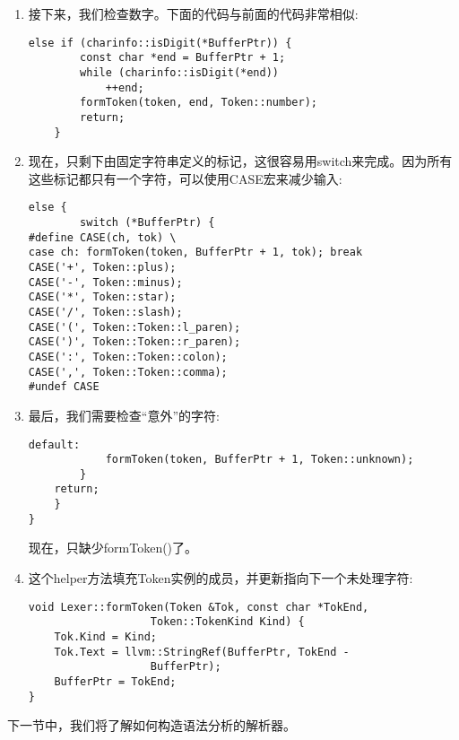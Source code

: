 \begin{enumerate}
\item 接下来，我们检查数字。下面的代码与前面的代码非常相似:
\begin{lstlisting}[caption={}]
	else if (charinfo::isDigit(*BufferPtr)) {
		const char *end = BufferPtr + 1;
		while (charinfo::isDigit(*end))
			++end;
		formToken(token, end, Token::number);
		return;
	}
\end{lstlisting}

\item 现在，只剩下由固定字符串定义的标记，这很容易用switch来完成。因为所有这些标记都只有一个字符，可以使用CASE宏来减少输入:
\begin{lstlisting}[caption={}]
	else {
		switch (*BufferPtr) {
#define CASE(ch, tok) \
case ch: formToken(token, BufferPtr + 1, tok); break
CASE('+', Token::plus);
CASE('-', Token::minus);
CASE('*', Token::star);
CASE('/', Token::slash);
CASE('(', Token::Token::l_paren);
CASE(')', Token::Token::r_paren);
CASE(':', Token::Token::colon);
CASE(',', Token::Token::comma);
#undef CASE
\end{lstlisting}

\item 最后，我们需要检查“意外”的字符:
\begin{lstlisting}[caption={}]
		default:
			formToken(token, BufferPtr + 1, Token::unknown);
		}
	return;
	}
}
\end{lstlisting}
现在，只缺少formToken()了。

\item 这个helper方法填充Token实例的成员，并更新指向下一个未处理字符:
\begin{lstlisting}[caption={}]
void Lexer::formToken(Token &Tok, const char *TokEnd,
                   Token::TokenKind Kind) {
	Tok.Kind = Kind;
	Tok.Text = llvm::StringRef(BufferPtr, TokEnd -
				   BufferPtr);
	BufferPtr = TokEnd;
}
\end{lstlisting}
\end{enumerate}

下一节中，我们将了解如何构造语法分析的解析器。\par






































